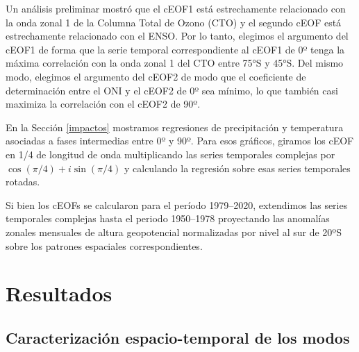 \documentclass[12pt,oneside,a4paper]{reedthesis}
\begin{document}
Un análisis preliminar mostró que el cEOF1 está estrechamente relacionado con la onda zonal 1 de la Columna Total de Ozono (CTO) y el segundo cEOF está estrechamente relacionado con el ENSO.
Por lo tanto, elegimos el argumento del cEOF1 de forma que la serie temporal correspondiente al cEOF1 de 0º tenga la máxima correlación con la onda zonal 1 del CTO entre 75°S y 45°S.
Del mismo modo, elegimos el argumento del cEOF2 de modo que el coeficiente de determinación entre el ONI y el cEOF2 de 0º sea mínimo, lo que también casi maximiza la correlación con el cEOF2 de 90º.

En la Sección \ref{impactos} mostramos regresiones de precipitación y temperatura asociadas a fases intermedias entre 0º y 90º.
Para esos gráficos, giramos los cEOF en 1/4 de longitud de onda multiplicando las series temporales complejas por \(\cos(\pi/4) + i\sin(\pi/4)\) y calculando la regresión sobre esas series temporales rotadas.

Si bien los cEOFs se calcularon para el período 1979--2020, extendimos las series temporales complejas hasta el periodo 1950--1978 proyectando las anomalías zonales mensuales de altura geopotencial normalizadas por nivel al sur de 20ºS sobre los patrones espaciales correspondientes.

\hypertarget{resultados-1}{%
\section{Resultados}\label{resultados-1}}

\hypertarget{caracterizaciuxf3n-espacio-temporal-de-los-modos}{%
\subsection{Caracterización espacio-temporal de los modos}\label{caracterizaciuxf3n-espacio-temporal-de-los-modos}}
\end{document}
